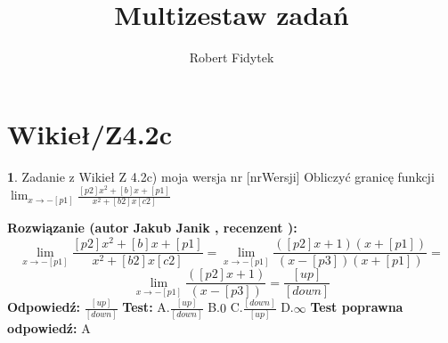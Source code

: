 \documentclass[12pt, a4paper]{article}
\title{Multizestaw zadań}
\author{Robert Fidytek}
\date{}
\theoremstyle{definition} %
\newtheorem{zad}{}
\newcommand{\kategoria}[1]{\section{#1}} %
\newcommand{\zadStart}[1]{\begin{zad}#1\newline} %
\newcommand{\zadStop}{\end{zad}}   %
\newcommand{\rozwStart}[2]{\noindent \textbf{Rozwiązanie (autor #1 , recenzent #2): }\newline} %
\newcommand{\rozwStop}{\newline}                                            %
\newcommand{\odpStart}{\noindent \textbf{Odpowiedź:}\newline}    %
\newcommand{\odpStop}{\newline}                                             %
\newcommand{\testStart}{\noindent \textbf{Test:}\newline} %
\newcommand{\testStop}{\newline} %
\newcommand{\kluczStart}{\noindent \textbf{Test poprawna odpowiedź:}\newline} %
\newcommand{\kluczStop}{\newline} %
\begin{document}
\maketitle


\kategoria{Wikieł/Z4.2c}
\zadStart{Zadanie z Wikieł Z 4.2c) moja wersja nr [nrWersji]}
Obliczyć granicę funkcji $\lim_{x \to -[p1]} \frac{[p2]x^2 +[b]x+[p1]}{x^2 + [b2]x [c2]}$
\zadStop
\rozwStart{Jakub Janik}{}
$$\lim_{x \to -[p1]} \frac{[p2]x^2 +[b]x+[p1]}{x^2 + [b2]x [c2]}=\lim_{x \to -[p1]} \frac{([p2]x+1)(x+[p1])}{(x-[p3])(x+[p1])}=$$
$$\lim_{x \to -[p1]} \frac{([p2]x+1)}{(x-[p3])}=\frac{[up]}{[down]}$$
\rozwStop
\odpStart
$\frac{[up]}{[down]}$
\odpStop
\testStart
A.$\frac{[up]}{[down]}$
B.$0$
C.$\frac{[down]}{[up]}$
D.$\infty$
\testStop
\kluczStart
A
\kluczStop
\end{document}
